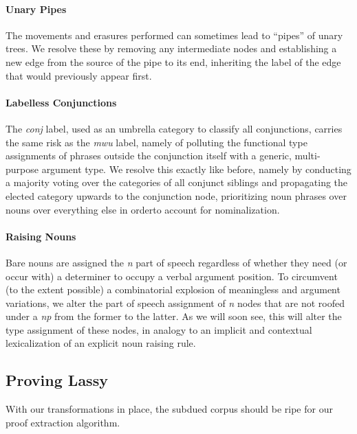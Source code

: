 \paragraph{Unary Pipes}
The movements and erasures performed can sometimes lead to ``pipes'' of unary trees.
We resolve these by removing any intermediate nodes and establishing a new edge from the source of the pipe to its end, inheriting the label of the edge that would previously appear first.

\paragraph{Labelless Conjunctions}
The \textit{conj} label, used as an umbrella category to classify all conjunctions, carries the same risk as the \textit{mwu} label, namely of polluting the functional type assignments of phrases outside the conjunction itself with a generic, multi-purpose argument type.
We resolve this exactly like before, namely by conducting a majority voting over the categories of all conjunct siblings and propagating the elected category upwards to the conjunction node, prioritizing noun phrases over nouns over everything else in orderto account for nominalization.

\paragraph{Raising Nouns}
Bare nouns are assigned the \textit{n} part of speech regardless of whether they need (or occur with) a determiner to occupy a verbal argument position.
To circumvent (to the extent possible) a combinatorial explosion of meaningless  and  argument variations, we alter the part of speech assignment of \textit{n} nodes that are not roofed under a \textit{np} from the former to the latter.
As we will soon see, this will alter the type assignment of these nodes, in analogy to an implicit and contextual lexicalization of an explicit noun raising rule.


\subsection{Proving Lassy}
With our transformations in place, the subdued corpus should be ripe for our proof extraction algorithm.


